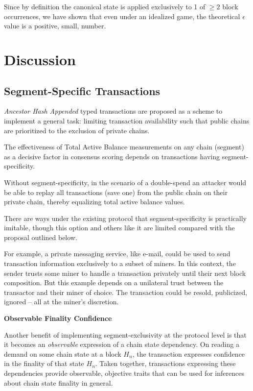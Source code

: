 \documentclass[11pt]{article}
\theoremstyle{plain}
\begin{document}
{{Since by definition the canonical state is applied exclusively to 1 of
$\geq 2$ block occurrences, we have shown that even under an idealized game,
the theoretical $\epsilon$ value is a positive, small, number.
} %


\section{\normalsize{Discussion}}

\subsection{\small{Segment-Specific Transactions}}\label{subsec:small{segment-specific-transactions}}

\textit{Ancestor Hash Appended} typed transactions are proposed
as a scheme to implement a general task: limiting transaction availability
such that public chains are prioritized to the exclusion of private chains.

The effectiveness of Total Active Balance measurements on any chain (segment)
as a decisive factor in consensus scoring depends on transactions having segment-specificity.

Without segment-specificity, in the scenario of a double-spend
an attacker would be able to replay all transactions (save one) from the public chain on their private chain,
thereby equalizing total active balance values.

There are ways under the existing protocol that segment-specificity is practically imitable,
though this option and others like it are limited compared with the proposal outlined below.

For example, a private messaging service, like e-mail,
could be used to send transaction information exclusively to a subset of miners.
In this context, the sender trusts some miner to handle a transaction privately until their next block composition.
But this example depends on a unilateral trust between the transactor and their miner of choice.
The transaction could be resold, publicized, ignored -- all at the miner's discretion.

\textbf{Observable Finality Confidence}

Another benefit of implementing segment-exclusivity at the protocol level
is that it becomes an \textit{observable} expression of a chain state dependency.
On reading a demand on some chain state at a block $H_n$, the transaction expresses
confidence in the finality of that state $H_n$.
Taken together, transactions expressing these dependencies provide
observable, objective traits that can be used for inferences about chain state finality in general.

}
\end{document}
